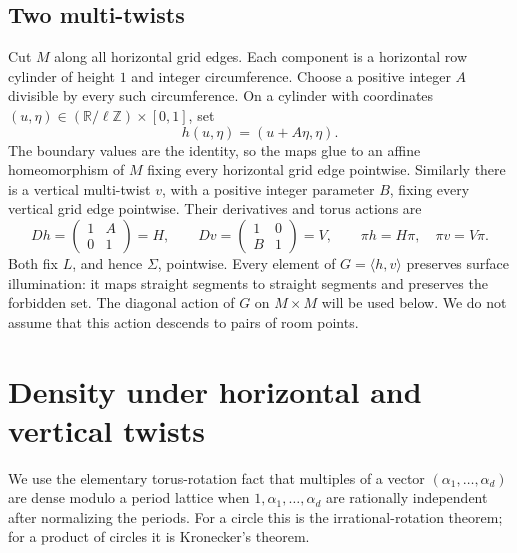 \documentclass[11pt]{article}
\theoremstyle{remark}
\newcommand{\Z}{\mathbb Z}
\newcommand{\R}{\mathbb R}
\begin{document}
\subsection{Two multi-twists}
Cut $M$ along all horizontal grid edges. Each component is a horizontal
row cylinder of height $1$ and integer circumference. Choose a positive
integer $A$ divisible by every such circumference. On a cylinder with
coordinates $(u,\eta)\in(\R/\ell\Z)\times[0,1]$, set
\[
 h(u,\eta)=(u+A\eta,\eta).
\]
The boundary values are the identity, so the maps glue to an affine
homeomorphism of $M$ fixing every horizontal grid edge pointwise.
Similarly there is a vertical multi-twist $v$, with a positive integer
parameter $B$, fixing every vertical grid edge pointwise. Their derivatives
and torus actions are
\[
 Dh=\begin{pmatrix}1&A\\0&1\end{pmatrix}=H,
 \qquad Dv=\begin{pmatrix}1&0\\B&1\end{pmatrix}=V,
 \qquad \pi h=H\pi,\quad\pi v=V\pi.
\]
Both fix $L$, and hence $\Sigma$, pointwise.
Every element of $G=\langle h,v\rangle$ preserves surface illumination:
it maps straight segments to straight segments and preserves the forbidden
set. The diagonal action of $G$ on $M\times M$ will be used below.
We do not assume that this action descends to pairs of room points.

\section{Density under horizontal and vertical twists}
We use the elementary torus-rotation fact that multiples of a vector
$(\alpha_1,\ldots,\alpha_d)$ are dense modulo a period lattice when
$1,\alpha_1,\ldots,\alpha_d$ are rationally independent after normalizing
the periods. For a circle this is the irrational-rotation theorem;
for a product of circles it is Kronecker's theorem.
\end{document}
